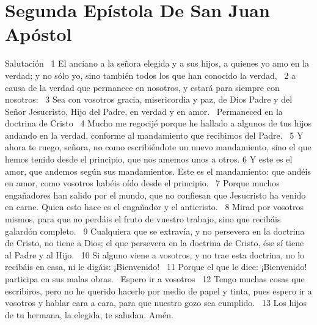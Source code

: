 \chapter{Segunda Epístola De San Juan Apóstol}



Salutación  
1 El anciano a la señora elegida y a sus hijos, a quienes yo amo en la verdad; y no sólo yo, sino también todos los que han conocido la verdad,  
2 a causa de la verdad que permanece en nosotros, y estará para siempre con nosotros:  
3 Sea con vosotros gracia, misericordia y paz, de Dios Padre y del Señor Jesucristo, Hijo del Padre, en verdad y en amor.  
Permaneced en la doctrina de Cristo  
4 Mucho me regocijé porque he hallado a algunos de tus hijos andando en la verdad, conforme al mandamiento que recibimos del Padre.  
5 Y ahora te ruego, señora, no como escribiéndote un nuevo mandamiento, sino el que hemos tenido desde el principio, que nos amemos unos a otros. 
6 Y este es el amor, que andemos según sus mandamientos. Este es el mandamiento: que andéis en amor, como vosotros habéis oído desde el principio.  
7 Porque muchos engañadores han salido por el mundo, que no confiesan que Jesucristo ha venido en carne. Quien esto hace es el engañador y el anticristo.  
8 Mirad por vosotros mismos, para que no perdáis el fruto de vuestro trabajo, sino que recibáis galardón completo.  
9 Cualquiera que se extravía, y no persevera en la doctrina de Cristo, no tiene a Dios; el que persevera en la doctrina de Cristo, ése sí tiene al Padre y al Hijo.  
10 Si alguno viene a vosotros, y no trae esta doctrina, no lo recibáis en casa, ni le digáis: ¡Bienvenido!  
11 Porque el que le dice: ¡Bienvenido! participa en sus malas obras.  
Espero ir a vosotros  
12 Tengo muchas cosas que escribiros, pero no he querido hacerlo por medio de papel y tinta, pues espero ir a vosotros y hablar cara a cara, para que nuestro gozo sea cumplido.  
13 Los hijos de tu hermana, la elegida, te saludan. Amén.